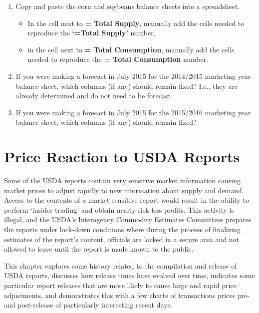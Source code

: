 \documentclass[
]{book}
\providecommand{\tightlist}{%
  \setlength{\itemsep}{0pt}\setlength{\parskip}{0pt}}
\begin{document}
\begin{enumerate}
\def\labelenumi{\arabic{enumi}.}
\item
  Copy and paste the corn and soybeans balance sheets into a spreadsheet.

  \begin{itemize}
  \tightlist
  \item
    In the cell next to \textbf{= Total Supply}, manually add the cells needed to reproduce the \textbf{`=Total Supply'} number.
  \item
    in the cell next to \textbf{= Total Consumption}, manually add the cells needed to reproduce the \textbf{= Total Consumption} number.
  \end{itemize}
\item
  If you were making a forecast in July 2015 for the 2014/2015 marketing year balance sheet, which columns (if any) should remain fixed? I.e., they are already determined and do not need to be forecast.
\item
  If you were making a forecast in July 2015 for the 2015/2016 marketing year balance sheet, which columns (if any) should remain fixed?
\end{enumerate}

\hypertarget{price-reaction-to-usda-reports}{%
\chapter{Price Reaction to USDA Reports}\label{price-reaction-to-usda-reports}}

Some of the USDA reports contain very sensitive market information causing market prices to adjust rapidly to new information about supply and demand. Access to the contents of a market sensitive report would result in the ability to perform `insider trading' and obtain nearly risk-less profits. This activity is illegal, and the USDA's Interagency Commodity Estimates Committees prepares the reports under lock-down conditions where during the process of finalizing estimates of the report's content, officials are locked in a secure area and not allowed to leave until the report is made known to the public.

This chapter explores some history related to the compilation and release of USDA reports, discusses how release times have evolved over time, indicates some particular report releases that are more likely to cause large and rapid price adjustments, and demonstrates this with a few charts of transactions prices pre- and post-release of particularly interesting recent days.
\end{document}
